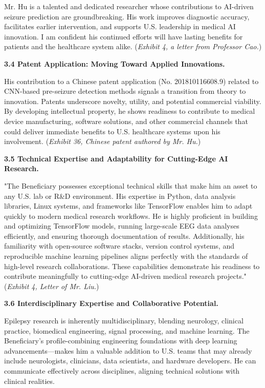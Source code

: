 \documentclass{article}
\begin{document}
Mr. Hu is a talented and dedicated researcher whose contributions to AI-driven seizure prediction are groundbreaking. His work improves diagnostic accuracy, facilitates earlier intervention, and supports U.S. leadership in medical AI innovation. I am confident his continued efforts will have lasting benefits for patients and the healthcare system alike. ({\it Exhibit 4, a letter from Professor Cao.})

{\bf 3.4 Patent Application: Moving Toward Applied Innovations.}

His contribution to a Chinese patent application (No. 201810116608.9) related to CNN-based pre-seizure detection methods signals a transition from theory to innovation. Patents underscore novelty, utility, and potential commercial viability. By developing intellectual property, he shows readiness to contribute to medical device manufacturing, software solutions, and other commercial channels that could deliver immediate benefits to U.S. healthcare systems upon his involvement. ({\it Exhibit 36, Chinese patent authored by Mr. Hu.})

{\bf 3.5 Technical Expertise and Adaptability for Cutting-Edge AI Research.}

"The Beneficiary possesses exceptional technical skills that make him an asset to any U.S. lab or R\&D environment. His expertise in Python, data analysis libraries, Linux systems, and frameworks like TensorFlow enables him to adapt quickly to modern medical research workflows. He is highly proficient in building and optimizing TensorFlow models, running large-scale EEG data analyses efficiently, and ensuring thorough documentation of results. Additionally, his familiarity with open-source software stacks, version control systems, and reproducible machine learning pipelines aligns perfectly with the standards of high-level research collaborations. These capabilities demonstrate his readiness to contribute meaningfully to cutting-edge AI-driven medical research projects." ({\it Exhibit 4, Letter of Mr. Liu.})


{\bf 3.6 Interdisciplinary Expertise and Collaborative Potential.}

Epilepsy research is inherently multidisciplinary, blending neurology, clinical practice, biomedical engineering, signal processing, and machine learning. The Beneficiary’s profile-combining engineering foundations with deep learning advancements—makes him a valuable addition to U.S. teams that may already include neurologists, clinicians, data scientists, and hardware developers. He can communicate effectively across disciplines, aligning technical solutions with clinical realities.
\end{document}
